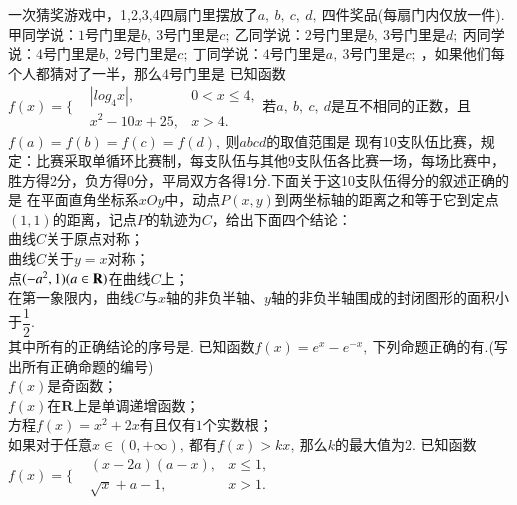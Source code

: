 \documentclass[marginline,noindent,answers,adobefonts]{BHCexam}
\begin{document}
\begin{questions}
\qs 一次猜奖游戏中，1,2,3,4四扇门里摆放了$ a,~b,~c,~d,~ $四件奖品(每扇门内仅放一件).甲同学说：$1$号门里是$ b,~ $$3$号门里是$ c;~ $乙同学说：$2$号门里是$ b,~ $$3$号门里是$ d;~ $丙同学说：$4$号门里是$ b,~ $$2$号门里是$ c;~ $丁同学说：$4$号门里是$ a,~ $$3$号门里是$ c;~ $，如果他们每个人都猜对了一半，那么$4$号门里是\xx
{}
\qs 已知函数$f(x)=\Bigg\{\begin{aligned}
&\left|log_4x\right|,&0<x\le 4,\\&x^2-10x+25,&x>4.
\end{aligned}$若$ a,~b,~c,~d $是互不相同的正数，且$ f(a)=f(b)=f(c)=f(d),~ $则$ abcd $的取值范围是\xx
{}
\qs 现有10支队伍比赛，规定：比赛采取单循环比赛制，每支队伍与其他9支队伍各比赛一场，每场比赛中，胜方得2分，负方得0分，平局双方各得1分.下面关于这10支队伍得分的叙述正确的是\xx
{} 
\qs 在平面直角坐标系$xOy$中，动点$ P(x,y) $到两坐标轴的距离之和等于它到定点$ (1,1) $的距离，记点$ P $的轨迹为$ C $，给出下面四个结论：\\
 曲线$ C $关于原点对称；\\
 曲线$ C $关于$ y=x $对称；\\
 点$ (-a^2,1)(a\in\mathbf{R}) $在曲线$ C $上；\\
 在第一象限内，曲线$ C $与$x$轴的非负半轴、$y$轴的非负半轴围成的封闭图形的面积小于$ \dfrac{1}{2}. $\\
其中所有的正确结论的序号是\tk.
\qs 已知函数$ f(x)=e^x-e^{-x} ,~$下列命题正确的有\tk.(写出所有正确命题的编号)\\
$f(x)$是奇函数；\\
$f(x)$在$ \mathbf{R} $上是单调递增函数；\\
方程$ f(x)=x^2+2x $有且仅有$ 1 $个实数根；\\
如果对于任意$ x\in (0,+\infty),~ $都有$ f(x)>kx,~ $那么$ k $的最大值为2.
\qs 已知函数$f(x)=\Bigg\{\begin{aligned}
&(x-2a)(a-x),&x\le 1,\\&\sqrt{x}+a-1,&x>1.
\end{aligned}$\\
\end{questions}
\end{document}
